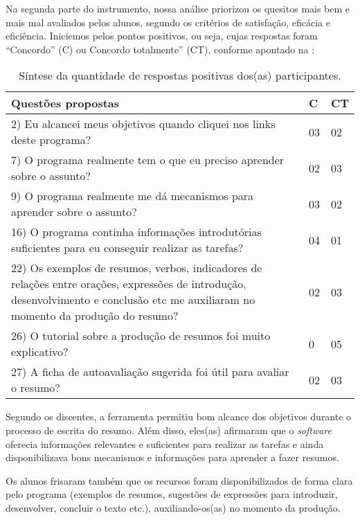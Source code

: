 \documentclass[portuguese]{textolivre}
\begin{document}
Na segunda parte do instrumento, nossa análise priorizou os quesitos mais bem e mais mal avaliados pelos alunos, segundo os critérios de satisfação, eficácia e eficiência. Iniciemos pelos pontos positivos, ou seja, cujas respostas foram “Concordo” (C) ou Concordo totalmente” (CT), conforme apontado na :

\begin{table}[htbp]
\begin{threeparttable}
\caption{Síntese da quantidade de respostas positivas dos(as) participantes.}
\label{tbl2}
\centering
\begin{tabular}{p{8cm} p{1.5cm} p{1.5cm}}
\toprule
Questões propostas & C & CT \\ 
 \midrule
2) Eu alcancei meus objetivos quando cliquei nos links deste programa? & 03 & 02 \\
7) O programa realmente tem o que eu preciso aprender sobre o assunto? & 02 & 03 \\
9) O programa realmente me dá mecanismos para aprender sobre o assunto? & 03 & 02 \\
16) O programa continha informações introdutórias suficientes para eu conseguir realizar as tarefas? & 04 & 01 \\
22) Os exemplos de resumos, verbos, indicadores de relações entre orações, expressões de introdução, desenvolvimento e conclusão etc me auxiliaram no momento da produção do resumo? & 02 & 03 \\
26) O tutorial sobre a produção de resumos foi muito explicativo? & 0 & 05 \\
27) A ficha de autoavaliação sugerida foi útil para avaliar o resumo? & 02 & 03 \\
\bottomrule
\end{tabular}
\end{threeparttable}
\end{table}

Segundo os discentes, a ferramenta permitiu bom alcance dos objetivos durante o processo de escrita do resumo. Além disso, eles(as) afirmaram que o \textit{software} oferecia informações relevantes e suficientes para realizar as tarefas e ainda disponibilizava bons mecanismos e informações para aprender a fazer resumos.

Os alunos frisaram também que os recursos foram disponibilizados de forma clara pelo programa (exemplos de resumos, sugestões de expressões para introduzir, desenvolver, concluir o texto etc.), auxiliando-os(as) no momento da produção.
\end{document}

